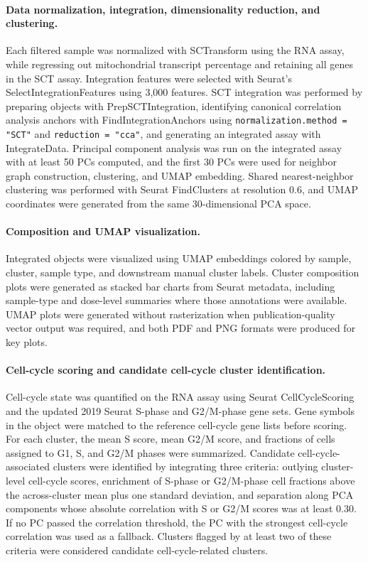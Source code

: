 \documentclass[11pt]{article}
\begin{document}
\paragraph{Data normalization, integration, dimensionality reduction, and clustering.}
Each filtered sample was normalized with SCTransform using the RNA assay, while regressing out mitochondrial transcript percentage and retaining all genes in the SCT assay. Integration features were selected with Seurat's SelectIntegrationFeatures using 3,000 features. SCT integration was performed by preparing objects with PrepSCTIntegration, identifying canonical correlation analysis anchors with FindIntegrationAnchors using \texttt{normalization.method = "SCT"} and \texttt{reduction = "cca"}, and generating an integrated assay with IntegrateData. Principal component analysis was run on the integrated assay with at least 50 PCs computed, and the first 30 PCs were used for neighbor graph construction, clustering, and UMAP embedding. Shared nearest-neighbor clustering was performed with Seurat FindClusters at resolution 0.6, and UMAP coordinates were generated from the same 30-dimensional PCA space.

\paragraph{Composition and UMAP visualization.}
Integrated objects were visualized using UMAP embeddings colored by sample, cluster, sample type, and downstream manual cluster labels. Cluster composition plots were generated as stacked bar charts from Seurat metadata, including sample-type and dose-level summaries where those annotations were available. UMAP plots were generated without rasterization when publication-quality vector output was required, and both PDF and PNG formats were produced for key plots.

\paragraph{Cell-cycle scoring and candidate cell-cycle cluster identification.}
Cell-cycle state was quantified on the RNA assay using Seurat CellCycleScoring and the updated 2019 Seurat S-phase and G2/M-phase gene sets. Gene symbols in the object were matched to the reference cell-cycle gene lists before scoring. For each cluster, the mean S score, mean G2/M score, and fractions of cells assigned to G1, S, and G2/M phases were summarized. Candidate cell-cycle-associated clusters were identified by integrating three criteria: outlying cluster-level cell-cycle scores, enrichment of S-phase or G2/M-phase cell fractions above the across-cluster mean plus one standard deviation, and separation along PCA components whose absolute correlation with S or G2/M scores was at least 0.30. If no PC passed the correlation threshold, the PC with the strongest cell-cycle correlation was used as a fallback. Clusters flagged by at least two of these criteria were considered candidate cell-cycle-related clusters.
\end{document}

